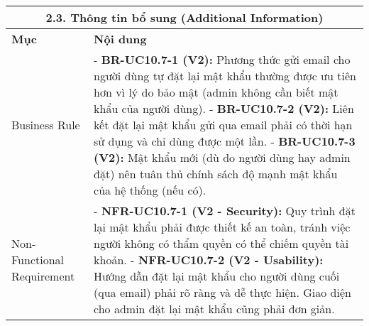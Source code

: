 \begin{longtable}{|m{4cm}|p{11cm}|}
\hline
\multicolumn{2}{|c|}{\textbf{2.3. Thông tin bổ sung (Additional Information)}} \\
\hline
\textbf{Mục} & \textbf{Nội dung} \\
\hline
Business Rule & - \textbf{BR-UC10.7-1 (V2):} Phương thức gửi email cho người dùng tự đặt lại mật khẩu thường được ưu tiên hơn vì lý do bảo mật (admin không cần biết mật khẩu của người dùng). \newline - \textbf{BR-UC10.7-2 (V2):} Liên kết đặt lại mật khẩu gửi qua email phải có thời hạn sử dụng và chỉ dùng được một lần. \newline - \textbf{BR-UC10.7-3 (V2):} Mật khẩu mới (dù do người dùng hay admin đặt) nên tuân thủ chính sách độ mạnh mật khẩu của hệ thống (nếu có). \\
\hline
Non-Functional Requirement & - \textbf{NFR-UC10.7-1 (V2 - Security):} Quy trình đặt lại mật khẩu phải được thiết kế an toàn, tránh việc người không có thẩm quyền có thể chiếm quyền tài khoản. \newline - \textbf{NFR-UC10.7-2 (V2 - Usability):} Hướng dẫn đặt lại mật khẩu cho người dùng cuối (qua email) phải rõ ràng và dễ thực hiện. Giao diện cho admin đặt lại mật khẩu cũng phải đơn giản. \\
\hline
\end{longtable}

